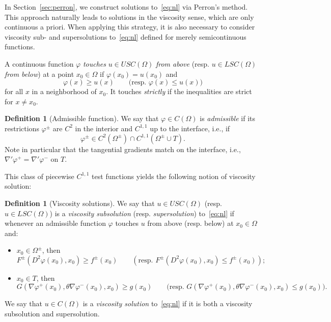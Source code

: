 \documentclass[letter,11pt]{amsart}
\newcommand{\uppers}{USC}
\newcommand{\lowers}{LSC}
\theoremstyle{definition}
\newtheorem{defn}[thm]{Definition}
\numberwithin{equation}{section}
\begin{document}
\medskip

In Section~\ref{sec:perron}, we construct solutions to~\eqref{eq:nl} via Perron's method.
This approach naturally leads to solutions in the viscosity sense, which are only continuous a priori.
When applying this strategy, it is also necessary to consider viscosity sub- and supersolutions to~\eqref{eq:nl} defined for merely semicontinuous functions.

\medskip

A continuous function $\varphi$ \emph{touches} $u \in \uppers(\Omega)$\emph{ from above} (resp. $u \in \lowers(\Omega)$ \emph{from below}) at a point $x_0 \in \Omega$ if $\varphi(x_0) = u(x_0)$ and 
\[
\varphi(x) \geq u(x) \qquad \text{(resp. } \varphi(x) \leq u(x))
\]
for all $x$ in a neighborhood of $x_0$.
It touches \emph{strictly} if the inequalities are strict for $x \neq x_0$.

\medskip

\begin{defn}[Admissible function]
We say that $\varphi \in C(\Omega)$ is \emph{admissible} if its restrictions $\varphi^{\pm}$ are $C^2$ in the interior and $C^{1,1}$ up to the interface, i.e., if
\[
\varphi^{\pm} \in C^2(\Omega^{\pm}) \cap C^{1,1}(\Omega^{\pm} \cup T).
\]
Note in particular that the tangential gradients match on the interface, i.e., $\nabla' \varphi^{+} = \nabla' \varphi^{-}$ on $T$.
\end{defn}


This class of piecewise $C^{1,1}$ test functions yields the following notion of viscosity solution:

\begin{defn}[Viscosity solutions]
We say that $u \in \uppers(\Omega)$ (resp. $u \in \lowers(\Omega)$) is a \emph{viscosity subsolution} (resp. \emph{supersolution}) to~\eqref{eq:nl} if whenever an admissible function $\varphi$ touches $u$ from above (resp. below) at $x_0 \in \Omega$ and:
\begin{itemize}
\item $x_0 \in \Omega^{\pm}$, then
\[
F^{\pm}(D^2 \varphi(x_0), x_0) \geq f^{\pm}(x_0) \qquad (\text{resp. } F^{\pm}(D^2 \varphi(x_0), x_0) \leq f^{\pm}(x_0));
\]
\item $x_0 \in T$, then
\[
G(\nabla \varphi^{+}(x_0), \theta \nabla \varphi^{-}(x_0), x_0) \geq g(x_0) 
\qquad 
\text{(resp. } 
G(\nabla \varphi^{+}(x_0), \theta \nabla \varphi^{-}(x_0), x_0) \leq g(x_0) ).
\]
\end{itemize}
We say that $u \in C(\Omega)$ is a \emph{viscosity solution} to~\eqref{eq:nl} if it is both a viscosity subsolution and supersolution.
\end{defn}
\end{document}
